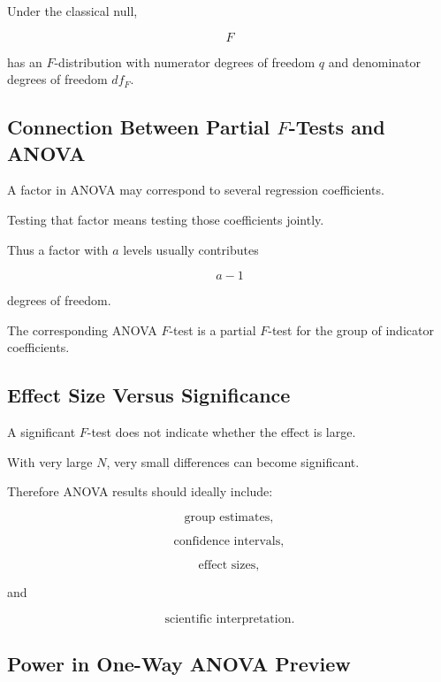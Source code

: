 Under the classical null,

\[
F
\]

has an \(F\)-distribution with numerator degrees of freedom \(q\) and
denominator degrees of freedom \(df_F\).

\subsection{Connection Between Partial \(F\)-Tests and ANOVA}
\label{subsec:partial-f-anova-connection}

A factor in ANOVA may correspond to several regression coefficients.

Testing that factor means testing those coefficients jointly.

Thus a factor with \(a\) levels usually contributes

\[
a-1
\]

degrees of freedom.

The corresponding ANOVA \(F\)-test is a partial \(F\)-test for the group
of indicator coefficients.

\subsection{Effect Size Versus Significance}
\label{subsec:anova-effect-size-significance}

A significant \(F\)-test does not indicate whether the effect is large.

With very large \(N\), very small differences can become significant.

Therefore ANOVA results should ideally include:

\[
\boxed{
\text{group estimates},
}
\]

\[
\boxed{
\text{confidence intervals},
}
\]

\[
\boxed{
\text{effect sizes},
}
\]

and

\[
\boxed{
\text{scientific interpretation}.
}
\]

\subsection{Power in One-Way ANOVA Preview}
\label{subsec:anova-power-preview}

